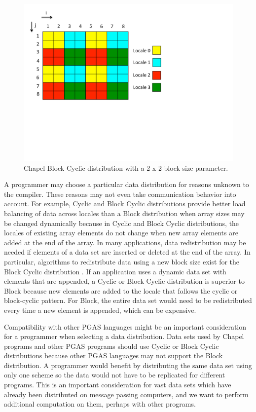 \begin{figure}
	\begin{center}
	\includegraphics[scale=0.50]{./Figures/block_cyc_dist}
	\caption{Chapel Block Cyclic distribution with a 2 x 2 block size parameter.}
	\label{block_cyc_dist}
	\end{center}
\end{figure}

A programmer may choose a particular data distribution for reasons unknown to the compiler. These reasons may not even take communication behavior into account. For example, Cyclic and Block Cyclic distributions provide better load balancing of data across locales than a Block distribution when array sizes may be changed dynamically because in Cyclic and Block Cyclic distributions, the locales of existing array elements do not change when new array elements are added at the end of the array. In many applications, data redistribution may be needed if elements of a data set are inserted or deleted at the end of the array. In particular, algorithms to redistribute data using a new block size exist for the Block Cyclic distribution \cite{prylli1997fast,walker1996redistribution}. If an application uses a dynamic data set with elements that are appended, a Cyclic or Block Cyclic distribution is superior to Block because new elements are added to the locale that follows the cyclic or block-cyclic pattern. For Block, the entire data set would need to be redistributed every time a new element is appended, which can be expensive. 

Compatibility with other PGAS languages might be an important consideration for a programmer when selecting a data distribution. Data sets used by Chapel programs and other PGAS programs should use Cyclic or Block Cyclic distributions because other PGAS languages may not support the Block distribution. A programmer would benefit by distributing the same data set using only one scheme so the data would not have to be replicated for different programs. This is an important consideration for vast data sets which have already been distributed on message passing computers, and we want to perform additional computation on them, perhaps with other programs.  

